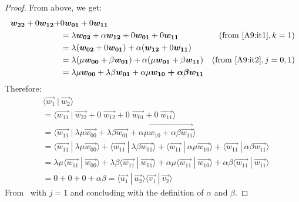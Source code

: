 \documentclass[runningheads,orivec]{llncs}
\def\scal#1#2{\langle{#1}~|~{#2}\rangle}
\begin{document}
\begin{lemma}
\begin{proof}
    From above, we get:
    \begin{align*}
        \vec{w_{22}} + 0\vec{w_{12}} + &0\vec{w_{01}} + 0\vec{w_{11}} \\
        &= \lambda\vec{w_{02}} + \alpha\vec{w_{12}} + 0\vec{w_{01}} + 0\vec{w_{11}} & (\text{from~\Cref{A9:it1}}, k =1)\\
        &= \lambda(\vec{w_{02}}+0\vec{w_{01}}) + \alpha(\vec{w_{12}}+0\vec{w_{11}})&\\
        &= \lambda(\mu\vec{w_{00}} + \beta\vec{w_{01}}) + \alpha(\mu\vec{w_{01}}+\beta\vec{w_{11}}) & (\text{from~\Cref{A9:it2}}, j=0,1)\\
        &= \lambda\mu\vec{w_{00}} + \lambda\beta\vec{w_{01}} + \alpha\mu\vec{w_{10} + \alpha\beta\vec{w_{11}}}
    \end{align*}
    Therefore:
    \begin{align*}
        &\scal{\vec{w_1}}{\vec{w_2}} \\
        &= \scal{\vec{w_{11}}}{\vec{w_{22}} + 0\;\vec{w_{12}} + 0\;\vec{w_{01}} + 0\;\vec{w_{11}}}\\
        &= \scal{\vec{w_{11}}}{\lambda\mu\vec{w_{00}} + \lambda\beta\vec{w_{01}} + \alpha\mu\vec{w_{10} + \alpha\beta\vec{w_{11}}}}\\
        &=\scal{\vec{w_{11}}}{\lambda\mu\vec{w_{00}}} + \scal{\vec{w_{11}}}{\lambda\beta\vec{w_{01}}} + \scal{\vec{w_{11}}}{\alpha\mu\vec{w_{10}}} + \scal{\vec{w_{11}}}{\alpha\beta\vec{w_{11}}}\\
        &=\lambda\mu\scal{\vec{w_{11}}}{\vec{w_{00}}} + \lambda\beta\scal{\vec{w_{11}}}{\vec{w_{01}}} + \alpha\mu\scal{\vec{w_{11}}}{\vec{w_{10}}} + \alpha\beta\scal{\vec{w_{11}}}{\vec{w_{11}}}\\
        &= 0 + 0 + 0 + \alpha\beta = \scal{\vec{u_1}}{\vec{u_2}}\scal{\vec{v_1}}{\vec{v_2}}
    \end{align*}
    From~ with $j=1$ and concluding with the definition of $\alpha$ and $\beta$.
\end{proof}
\end{lemma}
\end{document}
